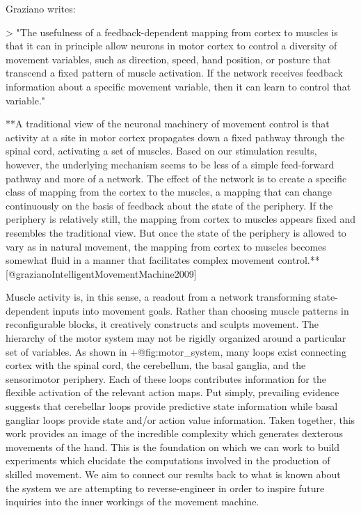 \documentclass[../main.tex]{subfiles}
\begin{document}
{{Graziano writes:

> "The usefulness of a feedback-dependent mapping from cortex to muscles is that it can in principle allow neurons in motor cortex to control a diversity of movement variables, such as direction, speed, hand position, or posture that transcend a fixed pattern of muscle activation. If the network receives feedback information about a specific movement variable, then it can learn to control that variable."

 **A traditional view of the neuronal machinery of movement control is that activity at a site in motor cortex propagates down a fixed pathway through the spinal cord, activating a set of muscles. Based on our stimulation results, however, the underlying mechanism seems to be less of a simple feed-forward pathway and more of a network. The effect of the network is to create a specific class of mapping from the cortex to the muscles, a mapping that can change continuously on the basis of feedback about the state of the periphery. If the periphery is relatively still, the mapping from cortex to muscles appears fixed and resembles the traditional view. But once the state of the periphery is allowed to vary as in natural movement, the mapping from cortex to muscles becomes somewhat fluid in a manner that facilitates complex movement control.** [@grazianoIntelligentMovementMachine2009] 

Muscle activity is, in this sense, a readout from a network transforming state-dependent inputs into movement goals. Rather than choosing muscle patterns in reconfigurable blocks, it creatively constructs and sculpts movement. The hierarchy of the motor system may not be rigidly organized around a particular set of variables. As shown in {+@fig:motor_system}, many loops exist connecting cortex with the spinal cord, the cerebellum, the basal ganglia, and the sensorimotor periphery. Each of these loops contributes information for the flexible activation of the relevant action maps. Put simply, prevailing evidence suggests that cerebellar loops provide predictive state information while basal gangliar loops provide state and/or action value information. Taken together, this work provides an image of the incredible complexity which generates dexterous movements of the hand. This is the foundation on which we can work to build experiments which elucidate the computations involved in the production of skilled movement. We aim to connect our results back to what is known about the system we are attempting to reverse-engineer in order to inspire future inquiries into the inner workings of the movement machine.

}}
\end{document}
